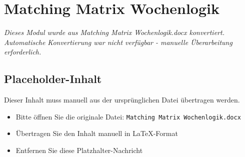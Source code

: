 
\section{Matching Matrix Wochenlogik}
\label{sec:matching-matrix-wochenlogik}

\begin{center}
\textit{Dieses Modul wurde aus Matching Matrix Wochenlogik.docx konvertiert.\\
Automatische Konvertierung war nicht verfügbar - manuelle Überarbeitung erforderlich.}
\end{center}


\subsection{Placeholder-Inhalt}

Dieser Inhalt muss manuell aus der ursprünglichen Datei übertragen werden.

\begin{itemize}
\item Bitte öffnen Sie die originale Datei: \texttt{Matching Matrix Wochenlogik.docx}
\item Übertragen Sie den Inhalt manuell in LaTeX-Format
\item Entfernen Sie diese Platzhalter-Nachricht
\end{itemize}
